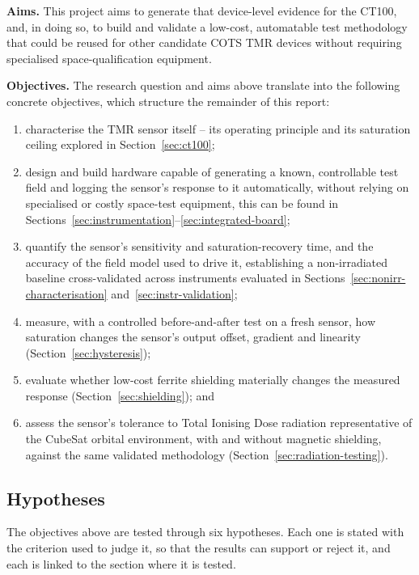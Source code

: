 \documentclass[12pt,a4paper]{article}
\begin{document}
\textbf{Aims.} This project aims to generate that device-level evidence for the CT100, and, in doing so, to build and validate a low-cost, automatable test methodology that could be reused for other candidate COTS TMR devices without requiring specialised space-qualification equipment.

\textbf{Objectives.} The research question and aims above translate into the following concrete objectives, which structure the remainder of this report:
\begin{enumerate}[label=(\roman*)]
\item characterise the TMR sensor itself -- its operating principle and its saturation ceiling explored in Section~\ref{sec:ct100};
\item design and build hardware capable of generating a known, controllable test field and logging the sensor's response to it automatically, without relying on specialised or costly space-test equipment, this can be found in Sections~\ref{sec:instrumentation}--\ref{sec:integrated-board};
\item quantify the sensor's sensitivity and saturation-recovery time, and the accuracy of the field model used to drive it, establishing a non-irradiated baseline cross-validated across instruments evaluated in Sections~\ref{sec:nonirr-characterisation} and~\ref{sec:instr-validation};
\item measure, with a controlled before-and-after test on a fresh sensor, how saturation changes the sensor's output offset, gradient and linearity (Section~\ref{sec:hysteresis});
\item evaluate whether low-cost ferrite shielding materially changes the measured response (Section~\ref{sec:shielding}); and
\item assess the sensor's tolerance to Total Ionising Dose radiation representative of the CubeSat orbital environment, with and without magnetic shielding, against the same validated methodology (Section~\ref{sec:radiation-testing}).
\end{enumerate}

\subsection{Hypotheses}
\label{sec:hypotheses}

The objectives above are tested through six hypotheses. Each one is stated with the criterion used to judge it, so that the results can support or reject it, and each is linked to the section where it is tested. 
\end{document}
